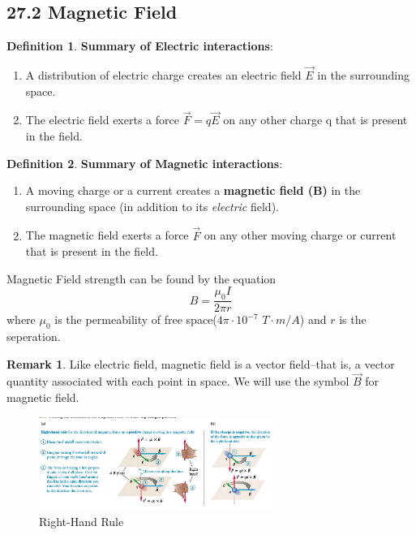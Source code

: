 \documentclass[12pt]{amsart}
\theoremstyle{definition}
\newtheorem{definition}{Definition} %
\newtheorem*{remark}{Remark}        %
\numberwithin{equation}{theorem}    %
\begin{document}
\subsection*{27.2 Magnetic Field}

\begin{definition}
    \textbf{Summary of Electric interactions}:
    \begin{enumerate}
        \item A distribution of electric charge creates an electric field $\vec{E}$ in the surrounding space.
        \item The electric field exerts a force $\vec{F} = q\vec{E}$ on any other charge q that is present in the field.
    \end{enumerate}
\end{definition}

\begin{definition}
    \textbf{Summary of Magnetic interactions}:
    \begin{enumerate}
        \item A moving charge or a current creates a \textbf{magnetic field (B)} in the surrounding
        space (in addition to its \textit{electric} field).
        \item  The magnetic field exerts a force $\vec{F}$ on any other moving charge or current that is present in the field.
    \end{enumerate}

    Magnetic Field strength can be found by the equation 
    $$B = \frac{\mu_0I}{2\pi r}$$ where $\mu_0$ is the permeability of free space($4\pi \cdot 10^{-7}$ $T\cdot m/A$) and $r$ is the seperation.

    \begin{remark}
        Like electric field, magnetic field is a vector field--that is, a vector quantity associated with each point in space. We will use the symbol $\vec{B}$ for magnetic field.
    \end{remark}
\end{definition}

\begin{figure}[H]
    \centering
    \includegraphics[width=3in]{Media/RHR.png}
    \caption{Right-Hand Rule}
    \label{Right-Hand Rule}
\end{figure}
\end{document}
